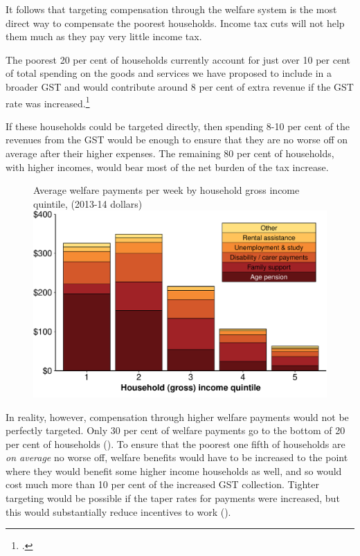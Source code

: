 \documentclass{grattanAlpha}
\begin{document}
It follows that targeting compensation through the welfare system is the most direct way to compensate the poorest households. Income tax cuts will not help them much as they pay very little income tax. 

The poorest 20 per cent of households currently account for just over 10 per cent of total spending on the goods and services we have proposed to include in a broader GST and would contribute around 8 per cent of extra revenue if the GST rate was increased.\footcite{ABS2015HouseholdIncomeWealth1314}

If these households could be targeted directly, then spending 8-10 per cent of the revenues from the GST would be enough to ensure that they are no worse off on average after their higher expenses. The remaining 80 per cent of households, with higher incomes, would bear most of the net burden of the tax increase.

\begin{figure}
%
{Average welfare payments per week by household gross income quintile, (2013-14 dollars)}
\includegraphics[width=\columnwidth]{atlas/figure/GST-Figure-6-1.pdf}

\end{figure}

In reality, however, compensation through higher welfare payments would not be perfectly targeted. Only 30 per cent of welfare payments go to the bottom of 20 per cent of households (). To ensure that the poorest one fifth of households are \emph{on average} no worse off, welfare benefits would have to be increased to the point where they would benefit some higher income households as well, and so would cost much more than 10 per cent of the increased GST collection. Tighter targeting would be possible if the taper rates for payments were increased, but this would substantially reduce incentives to work (). 
\end{document}

